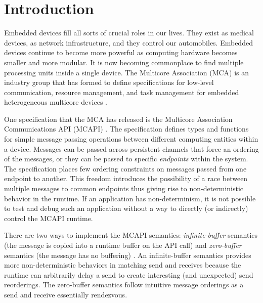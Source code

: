 \section{Introduction}
Embedded devices fill all sorts of crucial roles in our lives. They exist as
medical devices, as network infrastructure, and they control our automobiles.
Embedded devices continue to become more powerful as computing hardware becomes
smaller and more modular. It is now becoming commonplace to find multiple
processing units inside a single device. The Multicore Association (MCA) is an
industry group that has formed to define specifications for low-level
communication, resource management, and task management for embedded heterogeneous
multicore devices \cite{mca}.

One specification that the MCA has released is the Multicore
Association Communications API (MCAPI) \cite{mcapi}. The specification
defines types and functions for simple message passing operations between different
computing entities within a device. Messages can be passed across
persistent channels that force an ordering of the messages, or they
can be passed to specific \emph{endpoints} within the system. The
specification places few ordering constraints on messages passed from
one endpoint to another. This freedom introduces the possibility of a race between multiple messages to common endpoints thus giving rise to non-deterministic behavior in the runtime\cite{netzer:spdt96}. If an
application has non-determinism, it is not possible
to test and debug such an application without a way to directly (or
indirectly) control the MCAPI runtime.

There are two ways to implement the MCAPI semantics:
\textit{infinite-buffer} semantics (the message is copied into a
runtime buffer on the API call) and \textit{zero-buffer} semantics
(the message has no buffering)
\cite{sarvani:fm09}.  An infinite-buffer semantics provides
more non-deterministic behaviors in matching send and receives because
the runtime can arbitrarily delay a send to create interesting (and
unexpected) send reorderings. The zero-buffer semantics
follow intuitive message orderings as a send and receive essentially
rendezvous.

